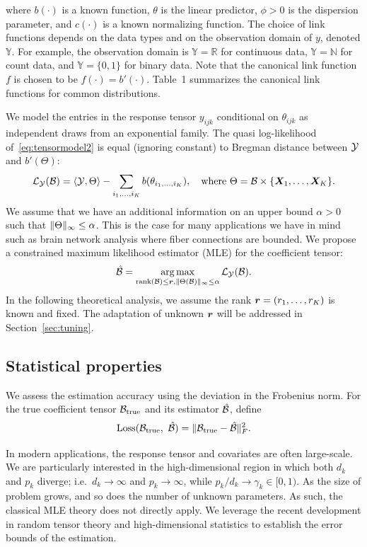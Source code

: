 \documentclass{article}
\theoremstyle{plain}
\theoremstyle{definition}
\begin{document}
where $b(\cdot)$ is a known function, $\theta$ is the linear predictor, $\phi>0$ is the dispersion parameter, and $c(\cdot)$ is a known normalizing function. The choice of link functions depends on the data types and on the observation domain of $y$, denoted $\mathbb{Y}$. For example, the observation domain is $\mathbb{Y}=\mathbb{R}$ for continuous data, $\mathbb{Y}=\mathbb{N}$ for count data, and  $\mathbb{Y}=\{0,1\}$ for binary data. 
Note that the canonical link function $f$ is chosen to be $f(\cdot)=b'(\cdot)$. Table~1 summarizes the canonical link functions for common distributions. 

We model the entries in the response tensor $y_{ijk}$ conditional on $\theta_{ijk}$ as independent draws from an exponential family. The quasi log-likelihood of~\eqref{eq:tensormodel2} is equal (ignoring constant) to Bregman distance between $\mathcal{Y}$ and $b'(\Theta)$:
\begin{align}
\mathcal{L}_{\mathcal{Y}}(\mathcal{B})=\langle \mathcal{Y}, \Theta \rangle - \sum_{i_1,\ldots,i_K} b(\theta_{i_1,\ldots,i_K}),\quad
\text{where}\ \Theta=\mathcal{B}\times\{\bm X_1,\ldots,\bm X_K\}.
\end{align}
We assume that we have an additional information on an upper bound $\alpha>0$ such that $\lVert\Theta\rVert_\infty\leq \alpha$. This is the case for many applications we have in mind such as brain network analysis where fiber connections are bounded. We propose a constrained maximum likelihood estimator (MLE) for the coefficient tensor:
\begin{equation}\label{eq:MLE}
\hat {\mathcal{B}}=\operatorname*{arg\,max}_{\text{rank}(\mathcal{B})\leq \bm{r}, \lVert\Theta(\mathcal{B})\rVert_\infty\leq \alpha} \mathcal{L}_{\mathcal{Y}}(\mathcal{B}).
\end{equation}
In the following theoretical analysis, we assume the rank $\bm{r}=(r_1,\ldots,r_K)$ is known and fixed. The adaptation of unknown $\bm{r}$ will be addressed in Section~\ref{sec:tuning}. 


\subsection{Statistical properties}
We assess the estimation accuracy using the deviation in the Frobenius norm. For the true coefficient tensor $\mathcal{B}_{\text{true}}$ and its estimator $\hat {\mathcal{B}}$, define
\[
\text{Loss}(\mathcal{B}_{\text{true}},\ \hat {\mathcal{B}})=\lVert\mathcal{B}_{\text{true}}- \hat {\mathcal{B}}\rVert_F^2.
\]

In modern applications, the response tensor and covariates are often large-scale. We are particularly interested in the high-dimensional region in which both $d_k$ and $p_k$ diverge; i.e.\ $d_k\to \infty$ and $p_k\to\infty$, while $p_k/ d_k \to \gamma_k \in[0,1)$. As the size of problem grows, and so does the number of unknown parameters. As such, the classical MLE theory does not directly apply. We leverage the recent development in random tensor theory and high-dimensional statistics to establish the error bounds of the estimation. 
\end{document}
